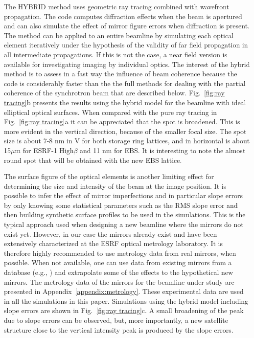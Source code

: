 \documentclass{iucr}              %
\begin{document}
The HYBRID method \cite{hybrid} uses geometric ray tracing combined with wavefront propagation. The code computes diffraction effects when the beam is apertured and can also simulate the effect of mirror figure errors when diffraction is present. The method can be applied to an entire beamline by simulating each optical element iteratively under the hypothesis of the validity of far field propagation in all intermediate propagations. If this is not the case, a near field version is available for investigating imaging by individual optics. The interest of the hybrid method is to assess in a fast way the influence of beam coherence because the code is considerably faster than the the full methods for dealing with the partial coherence of the synchrotron beam that are described below. Fig.~\ref{fig:ray tracing}b presents the results using the hybrid model for the beamline with ideal elliptical optical surfaces. When compared with the pure ray tracing in Fig.~\ref{fig:ray tracing}a it can be appreciated that the spot is broadened. This is more evident in the vertical direction, because of the smaller focal size. The spot size is about 7-8 nm in V for both storage ring lattices, and in horizontal is about 15$\mu$m for ESRF-1 High$\beta$ and 11 nm for EBS. It is interesting to note the almost round spot that will be obtained with the new EBS lattice. 

The surface figure of the optical elements is another limiting effect for determining the size and intensity of the beam at the image position. It is possible to infer the effect of mirror imperfections and in particular slope errors by only knowing some statistical parameters such as the RMS slope error  and then building synthetic surface profiles to be used in the simulations. This is the typical approach used when designing a new beamline where the mirrors do not exist yet. However, in our case the mirrors already exist and have been extensively characterized at the ESRF optical metrology laboratory. It is therefore highly recommended to use metrology data from real mirrors, when possible. When not available, one can use data from existing mirrors from a database (e.g., \cite{dabam}) and extrapolate some of the effects to the hypothetical new mirrors. The metrology data of the mirrors for the beamline under study are presented in Appendix~\ref{appendix:metrology}. These experimental data are used in all the simulations in this paper. Simulations using the hybrid model including slope errors are shown in Fig.~\ref{fig:ray tracing}c. A small broadening of the peak due to slope errors can be observed, but, more importantly, a new satellite structure close to the vertical intensity peak is produced by the slope errors. 
\end{document}
